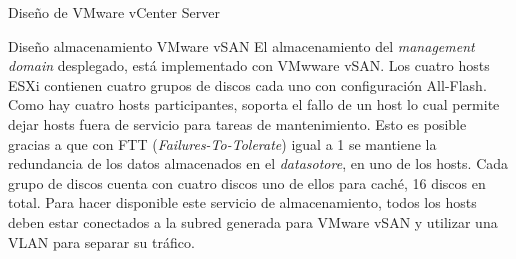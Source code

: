 \begin{subsubsection}{Diseño de VMware vCenter Server}

\end{subsubsection}


\begin{subsubsection}{Diseño almacenamiento VMware vSAN}
  El almacenamiento del \textit{management domain} desplegado, está implementado con VMwware vSAN. Los cuatro hosts ESXi contienen cuatro grupos de discos cada uno con configuración All-Flash. Como hay cuatro hosts participantes, soporta el fallo de un host lo cual permite dejar hosts fuera de servicio para tareas de mantenimiento. Esto es posible gracias a que con FTT (\textit{Failures-To-Tolerate}) igual a 1 se mantiene la redundancia de los datos almacenados en el \textit{datasotore}, en uno de los hosts. Cada grupo de discos cuenta con cuatro discos uno de ellos para caché, 16 discos en total. Para hacer disponible este servicio de almacenamiento, todos los hosts deben estar conectados a la subred generada para VMware vSAN y utilizar una VLAN para separar su tráfico.
\end{subsubsection}
    
